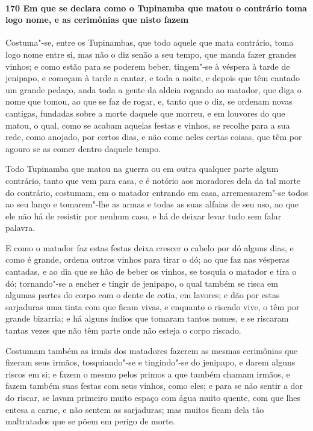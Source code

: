 \paragraph{170 Em que se declara como o Tupinamba que matou o contrário toma logo nome, e
as cerimônias que nisto fazem}

Costuma"-se, entre os Tupinambas, que todo aquele que mata contrário, toma logo nome entre
si, mas não o diz senão a seu tempo, que manda fazer grandes vinhos; e como estão para se
poderem beber, tingem"-se à véspera à tarde de jenipapo, e começam à tarde a cantar, e toda
a noite, e depois que têm cantado um grande pedaço, anda toda a gente da aldeia rogando ao
matador, que diga o nome que tomou, ao que se faz de rogar, e, tanto que o diz, se ordenam
novas cantigas, fundadas sobre a morte daquele que morreu, e em louvores do que matou, o
qual, como se acabam aquelas festas e vinhos, se recolhe para a sua rede, como anojado,
por certos dias, e não come neles certas coisas, que têm por agouro se as comer dentro
daquele tempo.

Todo Tupinamba que matou na guerra ou em outra qualquer parte algum contrário, tanto que
vem para casa, e é notório aos moradores dela da tal morte do contrário, costumam, em o
matador entrando em casa, arremessarem"-se todos ao seu lanço e tomarem"-lhe as armas e
todas as suas alfaias de seu uso, ao que ele não há de resistir por nenhum caso, e há de
deixar levar tudo sem falar palavra.

E como o matador faz estas festas deixa crescer o cabelo por dó alguns dias, e como é
grande, ordena outros vinhos para tirar o dó; ao que faz nas vésperas cantadas, e ao dia
que se hão de beber os vinhos, se tosquia o matador e tira o dó; tornando"-se a encher e
tingir de jenipapo, o qual também se risca em algumas partes do corpo com o dente de
cotia, em lavores; e dão por estas sarjaduras uma tinta com que ficam vivas, e enquanto o
riscado vive, o têm por grande bizarria; e há alguns índios que tomaram tantos nomes, e se
riscaram tantas vezes que não têm parte onde não esteja o corpo riscado.

Costumam também as irmãs dos matadores fazerem as mesmas cerimônias que fizeram seus
irmãos, tosquiando"-se e tingindo"-se do jenipapo, e darem alguns riscos em si; e fazem o
mesmo pelos primos a que também chamam irmãos, e fazem também suas festas com seus vinhos,
como eles; e para se não sentir a dor do riscar, se lavam primeiro muito espaço com água
muito quente, com que lhes entesa a carne, e não sentem as sarjaduras; mas muitos ficam
dela tão maltratados que se põem em perigo de morte.

